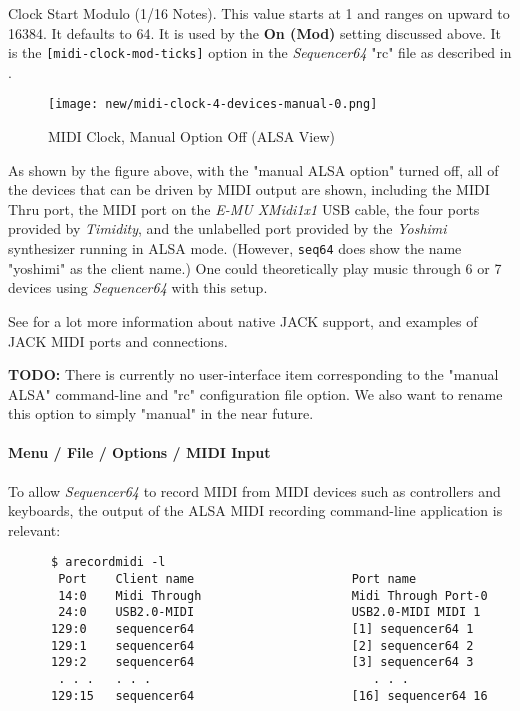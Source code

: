    Clock Start Modulo (1/16 Notes).
   This value starts at 1 and ranges on upward to 16384.
   It  defaults to 64.
   It is used by the \textbf{On (Mod)} setting discussed above.
   It is the \texttt{[midi-clock-mod-ticks]} option in the \textsl{Sequencer64}
   "rc" file as described in
   .

\begin{figure}[H]
   \centering 
   \texttt{[image: new/midi-clock-4-devices-manual-0.png]}
   \caption{MIDI Clock, Manual Option Off (ALSA View)}
   \label{fig:seq64_midi_clock_4_devices_manual_0}
\end{figure}

   As shown by the figure above, with the "manual ALSA option" turned off,
   all of the devices that can be driven by MIDI output are shown,
   including the MIDI Thru port, the MIDI port on the
   \textsl{E-MU XMidi1x1} USB cable,
   the four ports provided by \textsl{Timidity}, and the unlabelled
   port provided by the \textsl{Yoshimi} synthesizer running in ALSA mode.
   (However, \texttt{seq64} does show the name "yoshimi" as the client name.)
   One could theoretically play music through 6 or 7 devices using
   \textsl{Sequencer64} with this setup.

   See 
   for a lot more information about native JACK support, and examples of JACK
   MIDI ports and connections.

   \textbf{TODO:}
   There is currently no user-interface item corresponding to the "manual ALSA"
   command-line and "rc" configuration file option.
   We also want to rename this option to simply "manual" in the near future.

\paragraph{Menu / File / Options / MIDI Input}
\label{paragraph:seq64_menu_file_options_midi_input}

   To allow \textsl{Sequencer64} to record MIDI from MIDI devices such as
   controllers and keyboards, the output of the ALSA MIDI recording
   command-line application is relevant:

   \begin{verbatim}
      $ arecordmidi -l
       Port    Client name                      Port name
       14:0    Midi Through                     Midi Through Port-0
       24:0    USB2.0-MIDI                      USB2.0-MIDI MIDI 1
      129:0    sequencer64                      [1] sequencer64 1
      129:1    sequencer64                      [2] sequencer64 2
      129:2    sequencer64                      [3] sequencer64 3
       . . .   . . .                               . . .
      129:15   sequencer64                      [16] sequencer64 16
   \end{verbatim}

